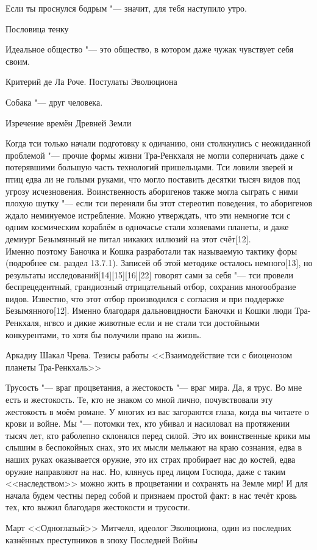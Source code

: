 \epigraph
{Если ты проснулся бодрым "--- значит, для тебя наступило утро.}
{Пословица тенку}

\epigraph
{Идеальное общество "--- это общество, в котором даже чужак чувствует себя своим.}
{Критерий де Ла Роче.
Постулаты Эволюциона}

\epigraph
{Собака "--- друг человека.}
{Изречение времён Древней Земли}

\epigraph
{Когда тси только начали подготовку к одичанию, они столкнулись с неожиданной проблемой "--- прочие формы жизни Тра-Ренкхаля не могли соперничать даже с потерявшими большую часть технологий пришельцами.
Тси ловили зверей и птиц едва ли не голыми руками, что могло поставить десятки тысяч видов под угрозу исчезновения.
Воинственность аборигенов также могла сыграть с ними плохую шутку "--- если тси переняли бы этот стереотип поведения, то аборигенов ждало неминуемое истребление.
Можно утверждать, что эти немногие тси с одним космическим кораблём в одночасье стали хозяевами планеты, и даже демиург Безымянный не питал никаких иллюзий на этот счёт[12].\\
Именно поэтому Баночка и Кошка разработали так называемую тактику форы (подробнее см. раздел 13.7.1).
Записей об этой методике осталось немного[13], но результаты исследований[14][15][16][22] говорят сами за себя "--- тси провели беспрецедентный, грандиозный отрицательный отбор, сохранив многообразие видов.
Известно, что этот отбор производился с согласия и при поддержке Безымянного[12].
Именно благодаря дальновидности Баночки и Кошки люди Тра-Ренкхаля, нгвсо и дикие животные если и не стали тси достойными конкурентами, то хотя бы получили право на жизнь.}
{Аркадиу Шакал Чрева.
Тезисы работы <<Взаимодействие тси с биоценозом планеты Тра-Ренкхаль>>}

\epigraph
{Трусость "--- враг процветания, а жестокость "--- враг мира.
Да, я трус.
Во мне есть и жестокость.
Те, кто не знаком со мной лично, почувствовали эту жестокость в моём романе.
У многих из вас загораются глаза, когда вы читаете о крови и войне.
Мы "--- потомки тех, кто убивал и насиловал на протяжении тысяч лет, кто раболепно склонялся перед силой.
Это их воинственные крики мы слышим в беспокойных снах, это их мысли мелькают на краю сознания, едва в наших руках оказывается оружие, это их страх пробирает нас до костей, едва оружие направляют на нас.
Но, клянусь пред лицом Господа, даже с таким <<наследством>> можно жить в процветании и сохранять на Земле мир!
И для начала будем честны перед собой и признаем простой факт: в нас течёт кровь тех, кто выжил благодаря жестокости и трусости.}
{Март <<Одноглазый>> Митчелл, идеолог Эволюциона, один из последних казнённых преступников в эпоху Последней Войны}

